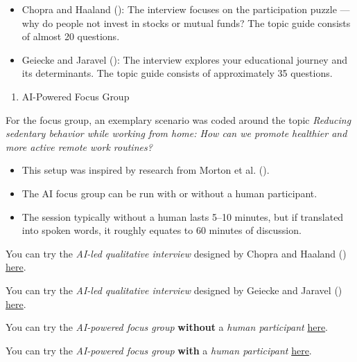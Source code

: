 \documentclass[
  letterpaper,
  DIV=11,
  numbers=noendperiod]{scrartcl}
\providecommand{\tightlist}{%
  \setlength{\itemsep}{0pt}\setlength{\parskip}{0pt}}
\begin{document}
\begin{itemize}
\item
  Chopra and Haaland (): The
  interview focuses on the participation puzzle --- why do people not
  invest in stocks or mutual funds? The topic guide consists of almost
  20 questions.
\item
  Geiecke and Jaravel (): The
  interview explores your educational journey and its determinants. The
  topic guide consists of approximately 35 questions.
\end{itemize}

\begin{enumerate}
\def\labelenumi{\arabic{enumi}.}
\setcounter{enumi}{1}
\tightlist
\item
  AI-Powered Focus Group
\end{enumerate}

For the focus group, an exemplary scenario was coded around the topic
\emph{Reducing sedentary behavior while working from home: How can we
promote healthier and more active remote work routines?}

\begin{itemize}
\item
  This setup was inspired by research from Morton et al.
  ().
\item
  The AI focus group can be run with or without a human participant.
\item
  The session typically without a human lasts 5--10 minutes, but if
  translated into spoken words, it roughly equates to 60 minutes of
  discussion.
\end{itemize}

You can try the \emph{AI-led qualitative interview} designed by Chopra
and Haaland ()
\href{https://tdbdo90q9g.execute-api.eu-north-1.amazonaws.com/default/qualtricsRedirectHandler}{here}.

You can try the \emph{AI-led qualitative interview} designed by Geiecke
and Jaravel ()
\href{https://ai-led-interview.streamlit.app/}{here}.

You can try the \emph{AI-powered focus group} \textbf{without} a
\emph{human participant} \href{https://focusgroup.streamlit.app/}{here}.

You can try the \emph{AI-powered focus group} \textbf{with} a
\emph{human participant}
\href{https://focusgroup-human.streamlit.app/}{here}.
\end{document}
